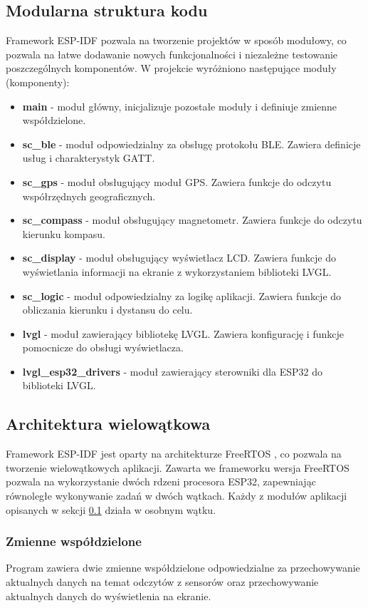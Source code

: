 \subsection{Modularna struktura kodu} \label{sec:modularna-struktura-kodu}
Framework ESP-IDF pozwala na tworzenie projektów w sposób modułowy, co pozwala na łatwe dodawanie nowych funkcjonalności i niezależne testowanie poszczególnych komponentów.
W projekcie wyróżniono następujące moduły (komponenty):
\begin{itemize}
    \item \textbf{main} - moduł główny, inicjalizuje pozostałe moduły i definiuje zmienne współdzielone.
    \item \textbf{sc\_ble} - moduł odpowiedzialny za obsługę protokołu BLE. Zawiera definicje usług i charakterystyk GATT.
    \item \textbf{sc\_gps} - moduł obsługujący moduł GPS. Zawiera funkcje do odczytu współrzędnych geograficznych.
    \item \textbf{sc\_compass} - moduł obsługujący magnetometr. Zawiera funkcje do odczytu kierunku kompasu.
    \item \textbf{sc\_display} - moduł obsługujący wyświetlacz LCD. Zawiera funkcje do wyświetlania informacji na ekranie z wykorzystaniem biblioteki LVGL.
    \item \textbf{sc\_logic} - moduł odpowiedzialny za logikę aplikacji. Zawiera funkcje do obliczania kierunku i dystansu do celu.
    \item \textbf{lvgl} - moduł zawierający bibliotekę LVGL. \cite{lvgl-esp32-port} Zawiera konfigurację i funkcje pomocnicze do obsługi wyświetlacza.
    \item \textbf{lvgl\_esp32\_drivers} - moduł zawierający sterowniki dla ESP32 do biblioteki LVGL. \cite{lvgl-esp32-drivers}
\end{itemize}

\subsection{Architektura wielowątkowa}
Framework ESP-IDF jest oparty na architekturze FreeRTOS \cite{freertos-docs}, co pozwala na tworzenie wielowątkowych aplikacji.
Zawarta we frameworku wersja FreeRTOS pozwala na wykorzystanie dwóch rdzeni procesora ESP32, zapewniając równoległe wykonywanie zadań w dwóch wątkach.
Każdy z modułów aplikacji opisanych w sekcji \ref{sec:modularna-struktura-kodu} działa w osobnym wątku.

\subsubsection{Zmienne współdzielone}
Program zawiera dwie zmienne współdzielone odpowiedzialne za przechowywanie aktualnych danych na temat odczytów z sensorów oraz przechowywanie aktualnych danych do wyświetlenia na ekranie.

